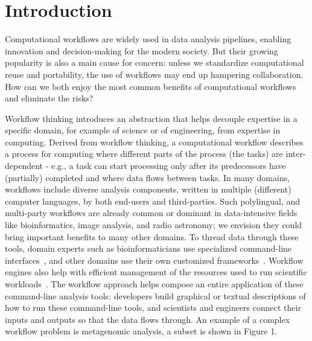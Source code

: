 \documentclass[sigconf,authordraft]{acmart}
\begin{document}
\maketitle

\section{Introduction}
Computational workflows are widely used in data analysis pipelines,
enabling innovation and decision-making for the modern society. But
their growing popularity is also a main cause for concern: unless we
standardize computational reuse and portability, the use of workflows
may end up hampering collaboration. How can we both enjoy the most
common benefits of computational workflows and eliminate the risks?

Workflow thinking introduces an abstraction that helps decouple
expertise in a specific domain, for example of science or of
engineering, from expertise in computing. Derived from workflow
thinking, a computational workflow describes a process for computing
where different parts of the process (the tasks) are inter-dependent -
e.g., a task can start processing only after its predecessors have
(partially) completed and where data flows between tasks. In many
domains, workflows include diverse analysis components, written in
multiple (different) computer languages, by both end-users and
third-parties. Such polylingual, and multi-party workflows are
already common or dominant in data-intensive fields like bioinformatics,
image analysis, and radio astronomy; we envision they could bring
important benefits to many other domains. To thread data through
these tools, domain experts such as bioinformaticians use specialized
command-line interfaces~\cite{seemann_ten_2013,georgeson_bionitio_2019}, and other
domains use their own customized frameworks~\cite{babuji_parsl_2019,berthold_knime_2009}.
Workflow engines also help with efficient management of the resources
used to run scientific workloads~\cite{deelman_pegasus_2015,couvares_workflow_2007}.
The workflow
approach helps compose an entire application of these command-line
analysis tools: developers build graphical or textual descriptions of
how to run these command-line tools, and scientists and engineers
connect their inputs and outputs so that the data flows through. An
example of a complex workflow problem is metagenomic analysis, a subset
is shown in Figure 1.
\end{document}

